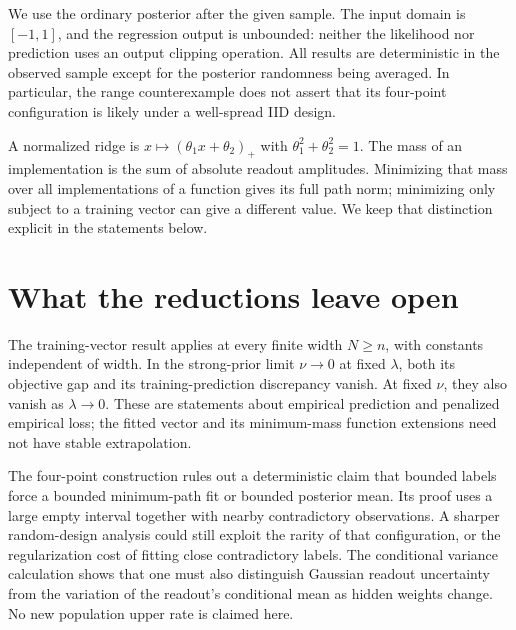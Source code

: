 \documentclass[11pt]{article}
\theoremstyle{remark}\newtheorem{remark}[theorem]{Remark}
\begin{document}
We use the ordinary posterior after the given sample. The input domain
is $[-1,1]$, and the regression output is unbounded: neither the
likelihood nor prediction uses an output clipping operation. All
results are deterministic in the observed sample except for the
posterior randomness being averaged. In particular, the range
counterexample does not assert that its four-point configuration is
likely under a well-spread IID design.

A normalized ridge is $x\mapsto(\theta_1x+\theta_2)_+$ with
$\theta_1^2+\theta_2^2=1$. The mass of an implementation is the sum
of absolute readout amplitudes. Minimizing that mass over all
implementations of a function gives its full path norm; minimizing
only subject to a training vector can give a different value. We
keep that distinction explicit in the statements below.









\section{What the reductions leave open}
The training-vector result applies at every finite width $N\ge n$,
with constants independent of width. In the strong-prior limit
$\nu\to0$ at fixed $\lambda$, both its objective gap and its
training-prediction discrepancy vanish. At fixed $\nu$, they also
vanish as $\lambda\to0$. These are statements about empirical
prediction and penalized empirical loss; the fitted vector and its
minimum-mass function extensions need not have stable extrapolation.

The four-point construction rules out a deterministic claim that
bounded labels force a bounded minimum-path fit or bounded posterior
mean. Its proof uses a large empty interval together with nearby
contradictory observations. A sharper random-design analysis could
still exploit the rarity of that configuration, or the regularization
cost of fitting close contradictory labels. The conditional variance
calculation shows that one must also distinguish Gaussian readout
uncertainty from the variation of the readout's conditional mean as
hidden weights change. No new population upper rate is claimed here.
\end{document}
